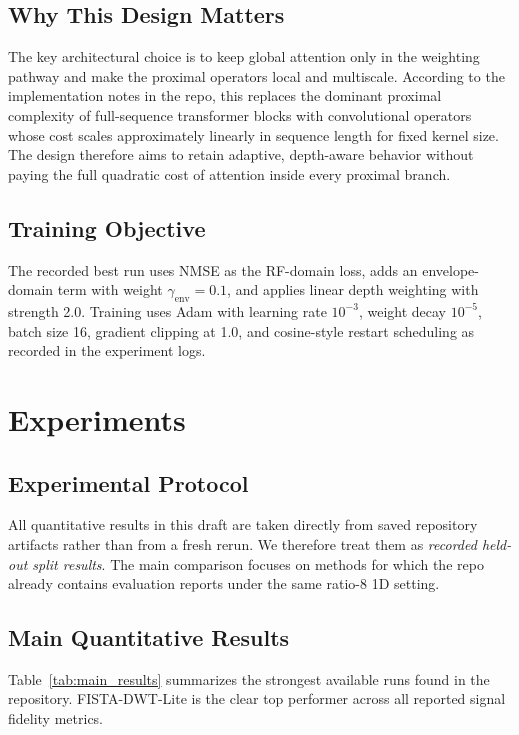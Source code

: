 \documentclass{article}
\begin{document}
\subsection{Why This Design Matters}
The key architectural choice is to keep global attention only in the weighting pathway and make the proximal operators local and multiscale. According to the implementation notes in the repo, this replaces the dominant proximal complexity of full-sequence transformer blocks with convolutional operators whose cost scales approximately linearly in sequence length for fixed kernel size. The design therefore aims to retain adaptive, depth-aware behavior without paying the full quadratic cost of attention inside every proximal branch.

\subsection{Training Objective}
The recorded best run uses NMSE as the RF-domain loss, adds an envelope-domain term with weight $\gamma_{\mathrm{env}}=0.1$, and applies linear depth weighting with strength 2.0. Training uses Adam with learning rate $10^{-3}$, weight decay $10^{-5}$, batch size 16, gradient clipping at 1.0, and cosine-style restart scheduling as recorded in the experiment logs.

\section{Experiments}
\subsection{Experimental Protocol}
All quantitative results in this draft are taken directly from saved repository artifacts rather than from a fresh rerun. We therefore treat them as \emph{recorded held-out split results}. The main comparison focuses on methods for which the repo already contains evaluation reports under the same ratio-8 1D setting.

\subsection{Main Quantitative Results}
Table~\ref{tab:main_results} summarizes the strongest available runs found in the repository. FISTA-DWT-Lite is the clear top performer across all reported signal fidelity metrics.
\end{document}
